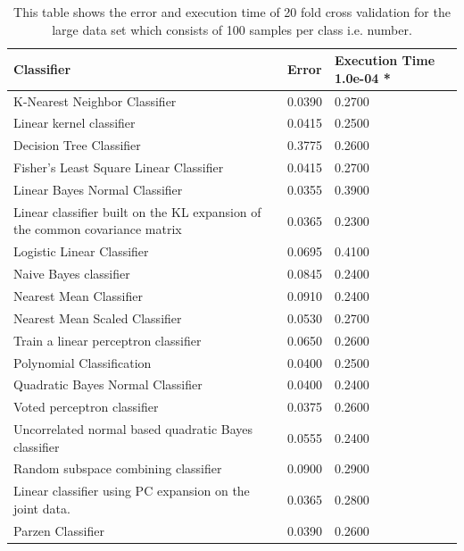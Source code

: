 \documentclass[%
        compressed,
        final,
        notitlepage,
        narroweqnarray,
        inline,
        twoside,
        ]{ieee}
\begin{document}
\begin{table}
    \begin{tabular} {p{5cm}lp{1.5cm}} %
        \hline
    Classifier & Error & Execution Time 1.0e-04 * \\
        \hline
K-Nearest Neighbor Classifier & 0.0390 & 0.2700 \\
Linear kernel classifier & 0.0415 & 0.2500 \\
Decision Tree Classifier & 0.3775 & 0.2600 \\
Fisher's Least Square Linear Classifier & 0.0415 & 0.2700 \\
Linear Bayes Normal Classifier & 0.0355 & 0.3900 \\
Linear classifier built on the KL expansion of the common covariance matrix & 0.0365 & 0.2300 \\
Logistic Linear Classifier & 0.0695 & 0.4100 \\
Naive Bayes classifier & 0.0845 & 0.2400 \\
Nearest Mean Classifier & 0.0910 & 0.2400 \\
Nearest Mean Scaled Classifier & 0.0530 & 0.2700 \\
Train a linear perceptron classifier & 0.0650 & 0.2600 \\
Polynomial Classification & 0.0400 & 0.2500 \\
Quadratic Bayes Normal Classifier & 0.0400 & 0.2400 \\
Voted perceptron classifier & 0.0375 & 0.2600 \\
Uncorrelated normal based quadratic Bayes classifier & 0.0555 & 0.2400 \\
Random subspace combining classifier & 0.0900 & 0.2900 \\
Linear classifier using PC expansion on the joint data. & 0.0365 & 0.2800 \\
Parzen Classifier & 0.0390 & 0.2600 \\
        \hline
    \end{tabular}
    \caption{ This table shows the error and execution time of 20 fold cross
    validation for the large data set which consists of 100 samples per class
i.e. number.  }
        
\end{table}
\end{document}
